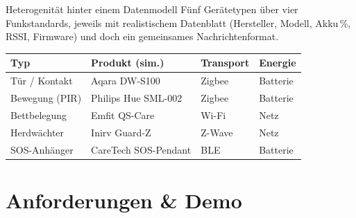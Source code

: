 \documentclass[aspectratio=169,11pt]{beamer}
\begin{document}
\begin{frame}{Heterogenit\"at hinter einem Datenmodell}
  F\"unf Ger\"atetypen \"uber vier Funkstandards, jeweils mit realistischem Datenblatt
  (Hersteller, Modell, Akku\,\%, RSSI, Firmware) und doch ein gemeinsames Nachrichtenformat.

  \vspace{0.6em}
  \begin{center}
  \footnotesize
  \begin{tabular}{@{}l l l l@{}}
    \toprule
    \textbf{Typ} & \textbf{Produkt (sim.)} & \textbf{Transport} & \textbf{Energie} \\
    \midrule
    T\"ur / Kontakt  & Aqara DW-S100        & Zigbee & Batterie \\
    Bewegung (PIR)   & Philips Hue SML-002  & Zigbee & Batterie \\
    Bettbelegung     & Emfit QS-Care        & Wi-Fi  & Netz \\
    Herdw\"achter    & Inirv Guard-Z        & Z-Wave & Netz \\
    SOS-Anh\"anger   & CareTech SOS-Pendant & BLE    & Batterie \\
    \bottomrule
  \end{tabular}
  \end{center}

\end{frame}

\section{Anforderungen \& Demo}
\end{document}
